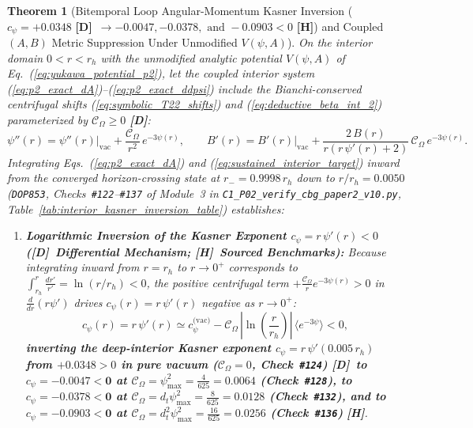 \documentclass[11pt,a4paper]{article}
\newcommand{\catD}{\textbf{\textcolor{blue!75!black}{[D]}}}
\newcommand{\catH}{\textbf{\textcolor{orange!85!black}{[H]}}}
\theoremstyle{plain}
\newtheorem{theorem}{Theorem}[section]
\theoremstyle{definition}
\theoremstyle{remark}
\numberwithin{equation}{section}
\begin{document}
\begin{theorem}[Bitemporal Loop Angular-Momentum Kasner Inversion ($c_{\psi} = +0.0348$ \catD\ $\to -0.0047, -0.0378, \text{ and } -0.0903 < 0$ \catH) and Coupled $(A, B)$ Metric Suppression Under Unmodified $V(\psi,A)$]
\label{thm:interior_kasner_inversion}
On the interior domain $0 < r < r_h$ with the unmodified analytic potential $V(\psi,A)$ of Eq.~(\ref{eq:yukawa_potential_p2}), let the coupled interior system (\ref{eq:p2_exact_dA})--(\ref{eq:p2_exact_ddpsi}) include the Bianchi-conserved centrifugal shifts (\ref{eq:symbolic_T22_shifts}) and (\ref{eq:deductive_beta_int_2}) parameterized by $\mathcal{C}_{\Omega} \ge 0$ \catD:
\begin{equation}
  \psi''(r) = \psi''(r)\Big|_{\text{vac}} + \frac{\mathcal{C}_{\Omega}}{r^2}\,e^{-3\psi(r)}, \qquad B'(r) = B'(r)\Big|_{\text{vac}} + \frac{2\,B(r)}{r\left(r\,\psi'(r) + 2\right)}\,\mathcal{C}_{\Omega}\,e^{-3\psi(r)}.
  \label{eq:sustained_interior_target}
\end{equation}
Integrating Eqs.~(\ref{eq:p2_exact_dA}) and (\ref{eq:sustained_interior_target}) inward from the converged horizon-crossing state at $r_- = 0.9998\,r_h$ down to $r/r_h = 0.0050$ (\texttt{DOP853}, Checks~\texttt{\#122}--\texttt{\#137} of Module~3 in \allowbreak\texttt{C1\_P02\_verify\_cbg\_paper2\_v10.py}, Table~\ref{tab:interior_kasner_inversion_table}) establishes:
\begin{enumerate}
    \item[\textnormal{(i)}] \textbf{Logarithmic Inversion of the Kasner Exponent $c_{\psi} = r\,\psi'(r) < 0$ (\catD\ Differential Mechanism; \catH\ Sourced Benchmarks):} Because integrating inward from $r = r_h$ to $r \to 0^+$ corresponds to $\int_{r_h}^{r}\frac{dr'}{r'} = \ln(r/r_h) < 0$, the positive centrifugal term $+\frac{\mathcal{C}_{\Omega}}{r}e^{-3\psi(r)} > 0$ in $\frac{d}{dr}(r\psi')$ drives $c_{\psi}(r) = r\,\psi'(r)$ negative as $r \to 0^+$:
    \begin{equation}
      c_{\psi}(r) = r\,\psi'(r) \simeq c_{\psi}^{\text{(vac)}} - \mathcal{C}_{\Omega}\,\left|\ln\!\left(\frac{r}{r_h}\right)\right|\,\langle e^{-3\psi}\rangle < 0,
      \label{eq:kasner_log_inversion}
    \end{equation}
    \textbf{inverting the deep-interior Kasner exponent $c_{\psi} = r\,\psi'(0.005\,r_h)$ from $+0.0348 > 0$ in pure vacuum ($\mathcal{C}_{\Omega} = 0$, Check~\texttt{\#124}) \catD\ to $c_{\psi} = \mathbf{-0.0047 < 0}$ at $\mathcal{C}_{\Omega} = \psi_{\max}^2 = \frac{4}{625} = 0.0064$ (Check~\texttt{\#128}), to $c_{\psi} = \mathbf{-0.0378 < 0}$ at $\mathcal{C}_{\Omega} = d_t\psi_{\max}^2 = \frac{8}{625} = 0.0128$ (Check~\texttt{\#132}), and to $c_{\psi} = \mathbf{-0.0903 < 0}$ at $\mathcal{C}_{\Omega} = d_t^2\psi_{\max}^2 = \frac{16}{625} = 0.0256$ (Check~\texttt{\#136})} \catH.

\end{enumerate}
\end{theorem}
\end{document}
